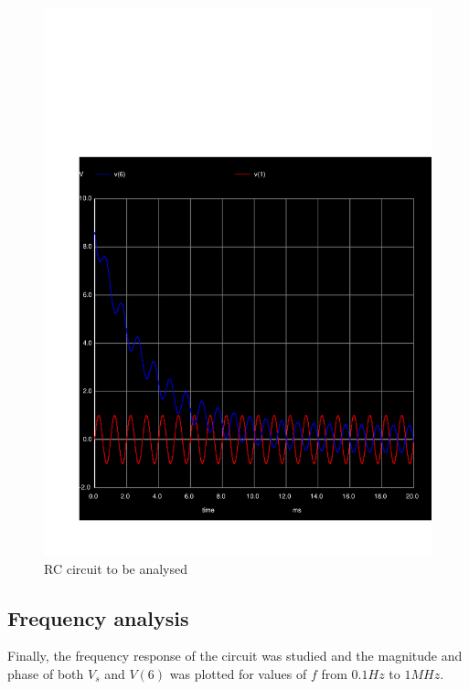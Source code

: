   \begin{figure}[H] \centering
    \includegraphics[width=1\linewidth]{../sim/trans4.pdf}
    \caption{RC circuit to be analysed}
    \label{fig:p4}
    \end{figure}

  \subsection{Frequency analysis}

Finally, the frequency response of the circuit was studied and the magnitude and phase
of both $V_s$ and $V(6)$ was plotted for values of $f$ from $0.1 Hz$ to $1 MHz$.

